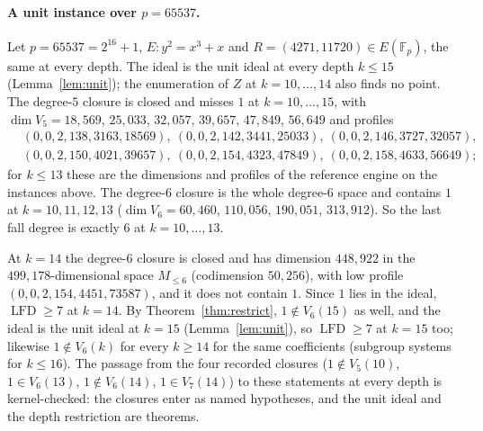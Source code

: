\documentclass[11pt]{article}
\theoremstyle{definition}\newtheorem{definition}[theorem]{Definition}
\theoremstyle{remark}\newtheorem{remark}[theorem]{Remark}
\newcommand{\F}{\mathbb F}
\newcommand{\lfd}{\operatorname{LFD}}
\begin{document}
\paragraph{A unit instance over $p=65537$.}
Let $p=65537=2^{16}+1$, $E:y^2=x^3+x$ and $R=(4271,11720)\in E(\F_p)$,
the same at every depth. The ideal is the unit ideal at every depth $k\le15$
(Lemma~\ref{lem:unit}); the enumeration of $Z$ at $k=10,\ldots,14$ also
finds no point. The degree-$5$ closure is closed and misses $1$ at
$k=10,\ldots,15$, with $\dim V_5=18{,}569$, $25{,}033$, $32{,}057$,
$39{,}657$, $47{,}849$, $56{,}649$ and profiles
\[
\begin{aligned}
&(0,0,2,138,3163,18569),\ (0,0,2,142,3441,25033),\ (0,0,2,146,3727,32057),\\
&(0,0,2,150,4021,39657),\ (0,0,2,154,4323,47849),\ (0,0,2,158,4633,56649);
\end{aligned}
\]
for $k\le13$ these
are the dimensions and profiles of the reference engine on the instances
above. The degree-$6$ closure is the whole degree-$6$ space and contains
$1$ at $k=10,11,12,13$ ($\dim V_6=60{,}460$, $110{,}056$, $190{,}051$,
$313{,}912$). So the last fall degree is exactly $6$ at $k=10,\ldots,13$.

At $k=14$ the degree-$6$ closure is closed and has dimension $448{,}922$ in
the $499{,}178$-dimensional space $M_{\le6}$ (codimension $50{,}256$), with
low profile $(0,0,2,154,4451,73587)$, and it does not contain $1$. Since
$1$ lies in the ideal, $\lfd\ge7$ at $k=14$. By
Theorem~\ref{thm:restrict}, $1\notin V_6(15)$ as well, and the ideal is the
unit ideal at $k=15$ (Lemma~\ref{lem:unit}), so $\lfd\ge7$ at $k=15$ too;
likewise $1\notin V_6(k)$ for every $k\ge14$ for the same coefficients
(subgroup systems for $k\le16$). The passage from the four recorded closures
($1\notin V_5(10)$, $1\in V_6(13)$, $1\notin V_6(14)$, $1\in V_7(14)$) to
these statements at every depth is kernel-checked: the closures enter as
named hypotheses, and the unit ideal and the depth restriction are theorems.
\end{document}

